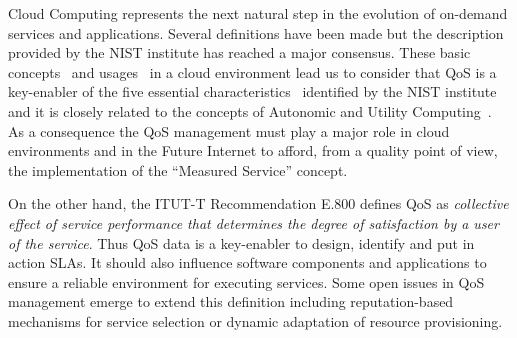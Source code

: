 % 
% 
Cloud Computing represents the next natural step in the evolution of on-demand services and applications. 
Several definitions have been made but the description~\cite{mell2011nist} provided by the NIST 
institute has reached a major consensus. These basic concepts~\cite{mell2011nist} and usages~\cite{cloud-usage} in a cloud environment 
lead us to consider that QoS is a key-enabler of the five essential characteristics~\cite{mell2011nist} identified by 
the NIST institute and it is closely related to the concepts of Autonomic and Utility Computing~\cite{Huebscher:2008:SAC:1380584.1380585}. 
As a consequence the QoS management must play a major role in cloud environments and in the Future Internet to 
afford, from a quality point of view, the implementation of the ``Measured Service'' concept.

On the other hand, the ITUT-T Recommendation E.800 defines QoS as \textit{collective effect of service performance that determines the degree of 
satisfaction by a user of the service}. Thus QoS data is a key-enabler to design, identify and put in action SLAs. It should also influence 
software components and applications to ensure a reliable environment for executing services. Some open issues in 
QoS management emerge to extend this definition including reputation-based mechanisms for service selection or 
dynamic adaptation of resource provisioning. 
% 

